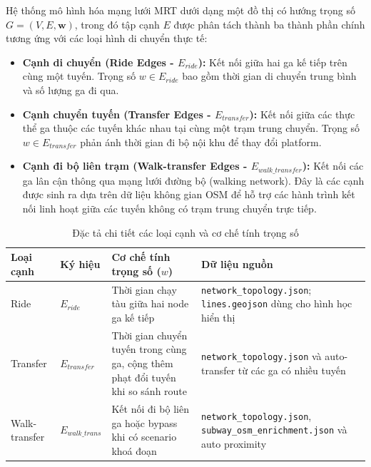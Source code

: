 \documentclass[../DoAn.tex]{subfiles}
\begin{document}
Hệ thống mô hình hóa mạng lưới MRT dưới dạng một đồ thị có hướng trọng số \(G = (V, E, \mathbf{w})\), trong đó tập cạnh \(E\) được phân tách thành ba thành phần chính tương ứng với các loại hình di chuyển thực tế:
\begin{itemize}
    \item \textbf{Cạnh di chuyển (Ride Edges - \(E_{ride}\)):} Kết nối giữa hai ga kế tiếp trên cùng một tuyến. Trọng số \(w \in E_{ride}\) bao gồm thời gian di chuyển trung bình và số lượng ga đi qua.
    \item \textbf{Cạnh chuyển tuyến (Transfer Edges - \(E_{transfer}\)):} Kết nối giữa các thực thể ga thuộc các tuyến khác nhau tại cùng một trạm trung chuyển. Trọng số \(w \in E_{transfer}\) phản ánh thời gian đi bộ nội khu để thay đổi platform.
    \item \textbf{Cạnh đi bộ liên trạm (Walk-transfer Edges - \(E_{walk\_transfer}\)):} Kết nối các ga lân cận thông qua mạng lưới đường bộ (walking network). Đây là các cạnh được sinh ra dựa trên dữ liệu không gian OSM để hỗ trợ các hành trình kết nối linh hoạt giữa các tuyến không có trạm trung chuyển trực tiếp.
\end{itemize}

\begin{table}[H]
\centering
\small
\caption{Đặc tả chi tiết các loại cạnh và cơ chế tính trọng số}
\label{tab:edge_types}
\begin{tabular}{|l|l|>{\raggedright\arraybackslash}p{5cm}|>{\raggedright\arraybackslash}p{3.5cm}|}
\hline
\textbf{Loại cạnh} & \textbf{Ký hiệu} & \textbf{Cơ chế tính trọng số (\(w\))} & \textbf{Dữ liệu nguồn} \\ \hline
Ride & \(E_{ride}\) & Thời gian chạy tàu giữa hai node ga kế tiếp & \texttt{network\_topology.json}; \texttt{lines.geojson} dùng cho hình học hiển thị \\ \hline
Transfer & \(E_{transfer}\) & Thời gian chuyển tuyến trong cùng ga, cộng thêm phạt đổi tuyến khi so sánh route & \texttt{network\_topology.json} và auto-transfer từ các ga có nhiều tuyến \\ \hline
Walk-transfer & \(E_{walk\_trans}\) & Kết nối đi bộ liên ga hoặc bypass khi có scenario khoá đoạn & \texttt{network\_topology.json}, \texttt{subway\_osm\_enrichment.json} và auto proximity \\ \hline
\end{tabular}
\end{table}
\end{document}
